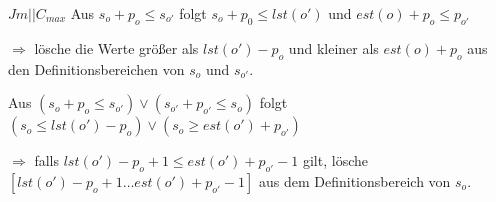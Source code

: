 \documentclass[hyperref={pdfpagelabels=false}]{beamer}
\begin{document}
\begin{frame}[allowframebreaks]{$Jm||C_{max}$}
Aus {\color{blue}$s_o + p_o \le s_{o'}$} folgt {\color{darkred}$s_o+p_0\le lst(o')$} und {\color{darkred}$est(o)+p_o\le p_{o'}$}

$\Rightarrow$ lösche die Werte größer als {\color{red}$lst(o')-p_o$} und kleiner als {\color{red}$est(o)+p_o$} aus den Definitionsbereichen von $s_o$ und $s_{o'}$.

\vspace{5pt}
Aus  {\color{blue}$(s_o + p_o \le s_{o'})\vee(s_{o'} + p_{o'} \le s_{o})$} folgt\\ \qquad \qquad
{\color{darkred} $(s_o\le lst(o') - p_o)\vee(s_o \ge est(o') + p_{o'})$}

$\Rightarrow$ falls $lst(o') - p_o + 1 \le est(o') + p_{o'} -1$ gilt, lösche {\color{red} $[lst(o') - p_o + 1 \dots est(o') + p_{o'} -1]$} aus dem Definitionsbereich von $s_o$.

\end{frame}
\end{document}
